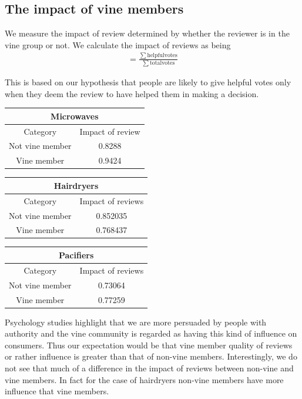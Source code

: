 \documentclass[reqno]{article}
\theoremstyle{definition}
\theoremstyle{definition}
\theoremstyle{remark}
\begin{document}
\subsection{The impact of vine members}
We measure the impact of review determined by whether the reviewer is in the vine group or not. We calculate the impact of reviews as being\\
\begin{align*}
   = \frac{\sum \mathrm{helpful votes}}{\sum \mathrm{total votes}}
\end{align*}

This is based on our hypothesis that people are likely to give helpful votes only when they deem the review to have helped them in making a decision.
\begin{center}
\begin{tabular}{|c|c|}
 \hline
 \multicolumn{2}{|c|}{Microwaves}\\
 \hline
 Category & Impact of review\\
 \hline
Not vine member & 0.8288 \\
Vine member & 0.9424\\
 \hline
\end{tabular}
\end{center}
\begin{center}
\begin{tabular}{|c|c|}
\hline
\multicolumn{2}{|c|}{Hairdryers}\\
\hline
Category & Impact of reviews\\
\hline
Not vine member & 0.852035 \\
Vine member & 0.768437\\
\hline
\end{tabular}
\end{center}

\begin{center}
\begin{tabular}{|c|c|}
\hline
\multicolumn{2}{|c|}{Pacifiers}\\
\hline
Category & Impact of reviews \\
\hline
Not vine member & 0.73064 \\
Vine member & 0.77259\\
\hline
\end{tabular}
\end{center}
Psychology studies highlight that we are more persuaded by people with authority and the vine community is regarded as having this kind of influence on consumers. Thus our expectation would be that vine member quality of reviews or rather influence is greater than that of non-vine members. Interestingly, we do not see that much of a difference in the impact of reviews between non-vine and vine members. In fact for the case of hairdryers non-vine members have more influence that vine members.
\end{document}
